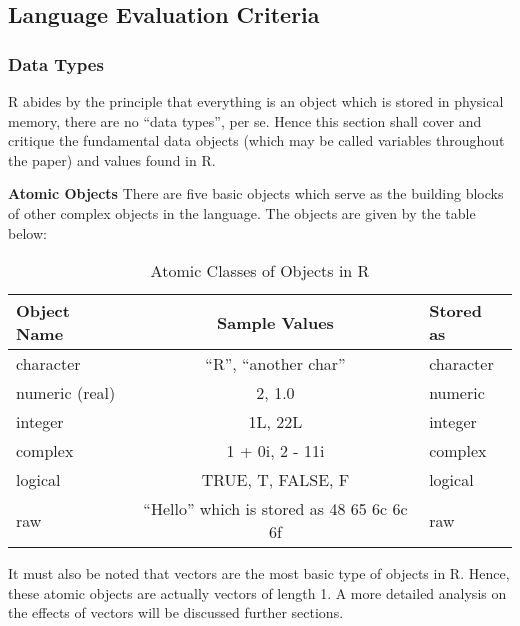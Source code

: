 \documentclass[12pt]{article}
\begin{document}
\subsection{Language Evaluation Criteria}

\subsubsection{Data Types}
R abides by the principle that everything is an object which is stored in physical memory, there are no ``data types'', per se. Hence this section shall cover and critique the fundamental data objects (which may be called variables throughout the paper) and values found in R.

\textbf{Atomic Objects} There are five basic objects which serve as the building blocks of other complex objects in the language. The objects are given by the table below:

\begin{table}[h!]
  \begin{center}
    \caption{Atomic Classes of Objects in R}
    \label{tab:table1}
    \begin{tabular}{|l|c|l|}
      \toprule %
      \textbf{Object Name} & \textbf{Sample Values} & \textbf{Stored as}\\
      \midrule %
      character & ``R'', ``another char'' & character \\
      \hline
      numeric (real) & 2, 1.0 & numeric \\
      \hline
      integer & 1L, 22L & integer \\
      \hline
      complex & 1 + 0i, 2 - 11i & complex \\
      \hline
      logical & TRUE, T, FALSE, F & logical \\
      \hline
      raw & ``Hello'' which is stored as 48 65 6c 6c 6f& raw \\
      \bottomrule
    \end{tabular}
  \end{center}
\end{table}

It must also be noted that vectors are the most basic type of objects in R. Hence, these atomic objects are actually vectors of length 1. A more detailed analysis on the effects of vectors will be discussed further sections.
\end{document}
